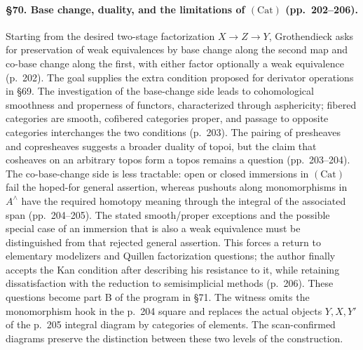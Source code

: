 \paragraph{\S70. Base change, duality, and the limitations of $(\mathrm{Cat})$ (pp.\ 202--206).}
Starting from the desired two-stage factorization $X\to Z\to Y$, Grothendieck asks for preservation of weak equivalences by base change along the second map and co-base change along the first, with either factor optionally a weak equivalence (p.\ 202). The goal supplies the extra condition proposed for derivator operations in \S69. The investigation of the base-change side leads to cohomological smoothness and properness of functors, characterized through asphericity; fibered categories are smooth, cofibered categories proper, and passage to opposite categories interchanges the two conditions (p.\ 203). The pairing of presheaves and copresheaves suggests a broader duality of topoi, but the claim that cosheaves on an arbitrary topos form a topos remains a question (pp.\ 203--204). The co-base-change side is less tractable: open or closed immersions in $(\mathrm{Cat})$ fail the hoped-for general assertion, whereas pushouts along monomorphisms in $A^{\wedge}$ have the required homotopy meaning through the integral of the associated span (pp.\ 204--205). The stated smooth/proper exceptions and the possible special case of an immersion that is also a weak equivalence must be distinguished from that rejected general assertion. This forces a return to elementary modelizers and Quillen factorization questions; the author finally accepts the Kan condition after describing his resistance to it, while retaining dissatisfaction with the reduction to semisimplicial methods (p.\ 206). These questions become part B of the program in \S71. The witness omits the monomorphism hook in the p.\ 204 square and replaces the actual objects $Y,X,Y'$ of the p.\ 205 integral diagram by categories of elements. The scan-confirmed diagrams preserve the distinction between these two levels of the construction.

